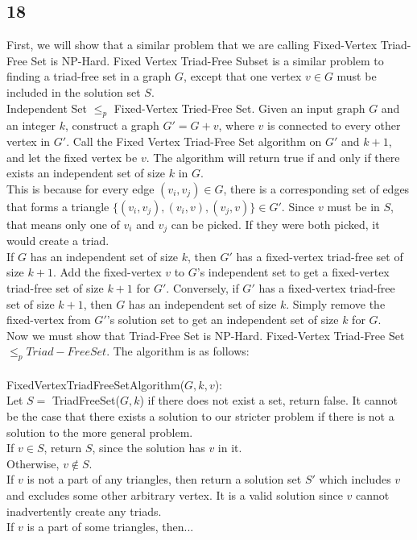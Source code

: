 \documentclass[letterpaper,notitlepage,twoside]{article}
\newcommand\tab[1][1cm]{\hspace*{#1}} %
\begin{document}
\subsection*{18}
First, we will show that a similar problem that we are calling Fixed-Vertex Triad-Free Set is NP-Hard. Fixed Vertex Triad-Free Subset is a similar problem to finding a triad-free set in a graph $G$, except that one vertex $v \in G$ must be included in the solution set $S$.
\\
Independent Set $\leq_p$ Fixed-Vertex Tried-Free Set. Given an input graph $G$ and an integer $k$, construct a graph $G' = G + v$, where $v$ is connected to every other vertex in $G'$. Call the Fixed Vertex Triad-Free Set algorithm on $G'$ and $k + 1$, and let the fixed vertex be $v$. The algorithm will return true if and only if there exists an independent set of size $k$ in $G$.
\\
This is because for every edge $(v_i, v_j) \in G$, there is a corresponding set of edges that forms a triangle $\{(v_i, v_j), (v_i, v), (v_j, v)\} \in G'$. Since $v$ must be in $S$, that means only one of $v_i$ and $v_j$ can be picked. If they were both picked, it would create a triad.
\\
If $G$ has an independent set of size $k$, then $G'$ has a fixed-vertex triad-free set of size $k + 1$. Add the fixed-vertex $v$ to $G$'s independent set to get a fixed-vertex triad-free set of size $k + 1$ for $G'$. Conversely, if $G'$ has a fixed-vertex triad-free set of size $k + 1$, then $G$ has an independent set of size $k$. Simply remove the fixed-vertex from $G'$'s solution set to get an independent set of size $k$ for $G$.
\\
Now we must show that Triad-Free Set is NP-Hard. Fixed-Vertex Triad-Free Set $\leq_p Triad-Free Set$. The algorithm is as follows:
\\\\
FixedVertexTriadFreeSetAlgorithm($G, k, v$):\\
\tab Let $S = $ TriadFreeSet($G, k$)
\tab if there does not exist a set, return false. It cannot be the case that there exists a solution to our stricter problem if there is not a solution to the more general problem.\\
\tab If $v \in S$, return $S$, since the solution has $v$ in it.\\
\tab Otherwise, $v \notin S$. \\
\tab If $v$ is not a part of any triangles, then return a solution set $S'$ which includes $v$ and excludes some other arbitrary vertex. It is a valid solution since $v$ cannot inadvertently create any triads.\\
\tab If $v$ is a part of some triangles, then...
\end{document}
